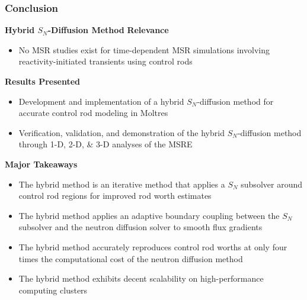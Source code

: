 \begin{frame}
  \frametitle{Conclusion}
  \begin{block}{\textbf{Hybrid $S_N$-Diffusion Method}}
    \textbf{Relevance}
    \begin{itemize}
      \item No MSR studies exist for time-dependent MSR simulations involving reactivity-initiated
        transients using control rods
    \end{itemize}
    \textbf{Results Presented}
    \begin{itemize}
      \item Development and implementation of a hybrid $S_N$-diffusion method for
        accurate control rod modeling in Moltres
      \item Verification, validation, and demonstration of the hybrid $S_N$-diffusion
        method through 1-D, 2-D, \& 3-D analyses of the MSRE
    \end{itemize}
    \textbf{Major Takeaways}
    \begin{itemize}
      \item The hybrid method is an iterative method that applies a $S_N$ subsolver around control
        rod regions for improved rod worth estimates
      \item The hybrid method applies an adaptive boundary coupling between
        the $S_N$ subsolver and the neutron diffusion solver to smooth flux gradients
      \item The hybrid method accurately reproduces control rod worths at only four times the
        computational cost of the neutron diffusion method
      \item The hybrid method exhibits decent scalability on high-performance computing clusters
    \end{itemize}
  \end{block}
\end{frame}
